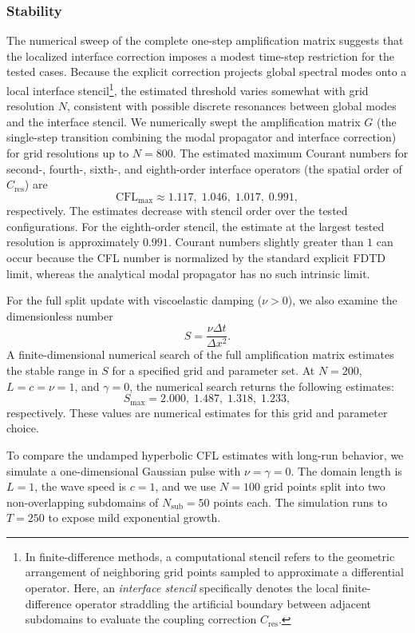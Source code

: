 \documentclass{Configuration_Files/PoliMi3i_thesis}
\newif\ifshowthesischanges
\DeclareRobustCommand{\thesischange}[2]{%
    \ifshowthesischanges
        \textcolor{#1}{#2}%
    \else
        #2%
    \fi
}
\def\thesischange#1#2{#2}%
\begin{document}
\subsubsection{Stability}
\label{sec:ard_stability_numerical}

The numerical sweep of the complete one-step amplification matrix suggests that the localized interface correction imposes a modest time-step restriction for the tested cases. Because the explicit correction projects global spectral modes onto a local interface stencil\footnote{\thesischange{red}{In finite-difference methods, a computational stencil refers to the geometric arrangement of neighboring grid points sampled to approximate a differential operator. Here, an \emph{interface stencil} specifically denotes the local finite-difference operator straddling the artificial boundary between adjacent subdomains to evaluate the coupling correction $C_{\text{res}}$.}}, the estimated threshold varies somewhat with grid resolution $N$, consistent with possible discrete resonances between global modes and the interface stencil. \thesischange{red}{We numerically swept the amplification matrix $G$ (the single-step transition combining the modal propagator and interface correction) for grid resolutions up to $N=800$. The estimated maximum Courant numbers for second-, fourth-, sixth-, and eighth-order interface operators (the spatial order of $C_{\text{res}}$) are}
\[
\mathrm{CFL}_{\max}
\approx
1.117,\;
1.046,\;
1.017,\;
0.991,
\]
respectively. The estimates decrease with stencil order over the tested configurations. For the eighth-order stencil, the estimate at the largest tested resolution is approximately $0.991$. Courant numbers slightly greater than $1$ can occur because the CFL number is normalized by the standard explicit FDTD limit, whereas the analytical modal propagator has no such intrinsic limit.

For the full split update with viscoelastic damping ($\nu > 0$), we also examine the dimensionless number
\[
S = \frac{\nu \Delta t}{\Delta x^2}.
\]
A finite-dimensional numerical search of the full amplification matrix estimates the stable range in $S$ for a specified grid and parameter set. At $N=200$, $L=c=\nu=1$, and $\gamma=0$, the numerical search returns the following estimates:
\[
S_{\max} =
2.000,\;
1.487,\;
1.318,\;
1.233,
\]
respectively. These values are numerical estimates for this grid and parameter choice.

To compare the undamped hyperbolic CFL estimates with long-run behavior, we simulate a one-dimensional Gaussian pulse with $\nu=\gamma=0$. The domain length is $L=1$, the wave speed is $c=1$, and we use $N=100$ grid points split into two non-overlapping subdomains of $N_{\mathrm{sub}}=50$ points each. The simulation runs to $T=250$ to expose mild exponential growth.
\end{document}

